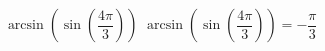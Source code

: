  {$\arcsin\left(\sin\left(\dfrac{4\pi}{3}\right) \right)$}
{ $\arcsin\left(\sin\left(\dfrac{4\pi}{3}\right) \right) = -\dfrac{\pi}{3}$}
